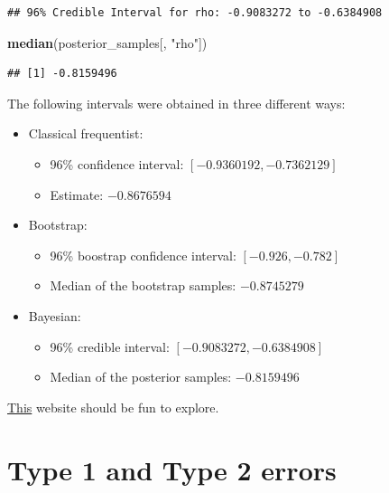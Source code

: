 \documentclass[
]{book}
\newenvironment{Shaded}{\begin{snugshade}}{\end{snugshade}}
\newcommand{\FunctionTok}[1]{\textcolor[rgb]{0.13,0.29,0.53}{\textbf{#1}}}
\newcommand{\NormalTok}[1]{#1}
\newcommand{\StringTok}[1]{\textcolor[rgb]{0.31,0.60,0.02}{#1}}
\providecommand{\tightlist}{%
  \setlength{\itemsep}{0pt}\setlength{\parskip}{0pt}}
\begin{document}
\begin{verbatim}
## 96% Credible Interval for rho: -0.9083272 to -0.6384908
\end{verbatim}

\begin{Shaded}
\begin{Highlighting}[]
\FunctionTok{median}\NormalTok{(posterior\_samples[, }\StringTok{"rho"}\NormalTok{])}
\end{Highlighting}
\end{Shaded}

\begin{verbatim}
## [1] -0.8159496
\end{verbatim}

The following intervals were obtained in three different ways:

\begin{itemize}
\tightlist
\item
  Classical frequentist:

  \begin{itemize}
  \tightlist
  \item
    96\% confidence interval: \([-0.9360192, -0.7362129]\)
  \item
    Estimate: \(-0.8676594\)
  \end{itemize}
\item
  Bootstrap:

  \begin{itemize}
  \tightlist
  \item
    96\% boostrap confidence interval: \([-0.926, -0.782]\)
  \item
    Median of the bootstrap samples: \(-0.8745279\)
  \end{itemize}
\item
  Bayesian:

  \begin{itemize}
  \tightlist
  \item
    96\% credible interval: \([-0.9083272, -0.6384908]\)
  \item
    Median of the posterior samples: \(-0.8159496\)
  \end{itemize}
\end{itemize}

\href{https://seeing-theory.brown.edu/frequentist-inference/index.html}{This}
website should be fun to explore.

\section{Type 1 and Type 2 errors}\label{error_types}
\end{document}
